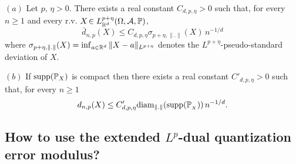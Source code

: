  \begin{prop} \label{PdtQErrop} $(a)$ Let
 $p,\,\eta>0$. There exists 
 a real constant $C_{d, p,\eta}>0$ such that, for every $n\ge 1$
and every r.v.  $X\!\in L_{\mathbb{R}^d}^{p+\eta}(\Omega,{\cal A}, \mathbb{P})$, 
 \[ 
 \bar d_{n,p}(X)\le C_{d,p,\eta}\sigma_{p+\eta,\|.\|}(X)\,n^{-1/d}
 \] 
 where $\sigma_{p+\eta,\|.\|}(X)= \inf_{a\in \mathbb{R}^d} \|X-a\|_{L^{p+\eta}}$ denotes the $L^{p+\eta}$-pseudo-standard deviation of $X$. 
 
 \smallskip
\noindent $(b)$  If $\operatorname{supp}(\mathbb{P}_X)$ is compact then there exists 
 a real constant $C'_{d, p,\eta}>0$ such that, for every $n\ge 1$
 \[
 d_{n,p}(X)\le C'_{d,p,\eta}{\rm diam}_{\lVert.\rVert}({\rm supp}(\mathbb{P}_{_X}))\,n^{-1/d}. 
 \]
\end{prop}

  
  
  
  
  
\subsection{How to use the extended $L^p$-dual quantization error modulus?} \label{sec:motiv}
%

